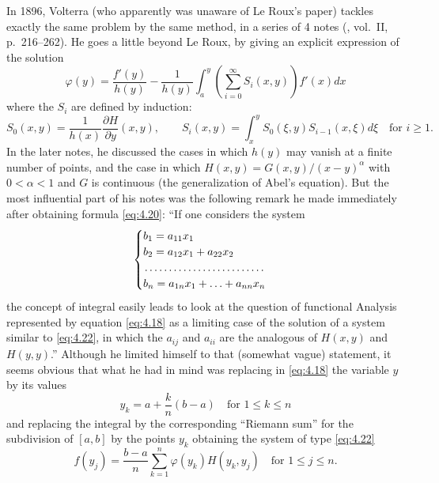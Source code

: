 \documentclass[12pt,a4paper,leqno,twoside]{extbook}
\newcommand{\pder}[2]{\frac{\partial #1}{\partial #2}}
\begin{document}
In 1896, Volterra (who apparently was unaware of Le Roux's paper) tackles exactly the same problem by the same method, in a series of 4 notes (\cite{219}, vol.~II, p.~216--262). He goes a little beyond Le Roux, by giving an explicit expression of the solution
\begin{equation}
    \label{eq:4.20}
    \varphi(y) = \frac{f'(y)}{h(y)} - \frac{1}{h(y)} \int_a^y \left( \sum_{i=0}^\infty S_i(x, y) \right) f'(x) dx
\end{equation}
where the \(S_i\) are defined by induction:
\begin{equation}
    \label{eq:4.21}
    S_0(x, y) = \frac{1}{h(x)}\pder{H}{y}(x, y), \qquad S_i(x, y) = \int_x^y S_0(\xi, y)S_{i-1}(x, \xi)d\xi \quad \text{for } i \geq 1.
\end{equation}
In the later notes, he discussed the cases in which \(h(y)\) may vanish at a finite number of points, and the case in which \(H(x,y) = G(x,y)/(x-y)^\alpha\) with \(0 < \alpha < 1\) and \(G\) is continuous (the generalization of Abel's equation). But the most influential part of his notes was the following remark he made immediately after obtaining formula \eqref{eq:4.20}: ``If one considers the system
\begin{equation}
    \label{eq:4.22}
    \begin{cases}
        b_1 = a_{11} x_1 \\
        b_2 = a_{12} x_1 + a_{22} x_2 \\
        \dotfill \\
        b_n = a_{1n} x_1 + \ldots + a_{nn} x_n
    \end{cases}
\end{equation}
the concept of integral easily leads to look at the question of functional Analysis represented by equation \eqref{eq:4.18} as a limiting case of the solution of a system similar to \eqref{eq:4.22}, in which the \(a_{ij}\) and \(a_{ii}\) are the analogous of \(H(x,y)\) and \(H(y,y)\).'' Although he limited himself to that (somewhat vague) statement, it seems obvious that what he had in mind was replacing in \eqref{eq:4.18} the variable \(y\) by its values
\[
    y_k = a + \frac{k}{n}(b-a) \quad \text{for } 1 \leq k \leq n
\]
and replacing the integral by the corresponding ``Riemann sum'' for the subdivision of \([a,b]\) by the points \(y_k\) obtaining the system of type \eqref{eq:4.22}
\begin{equation}
    f(y_j) = \frac{b-a}{n} \sum_{k=1}^n \varphi(y_k) H(y_k, y_j) \quad \text{for } 1 \leq j \leq n.
\end{equation}
\end{document}
